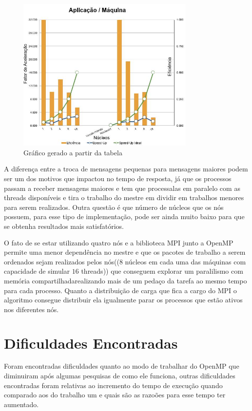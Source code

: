 \documentclass[11pt]{IEEEtran}
\begin{document}
	\begin{figure}[H]
		\centering
		\includegraphics[width=88mm]{graph.png}
		\caption{Gráfico gerado a partir da tabela}
		\label{fig_table}
	\end{figure}

	A diferença entre a troca de mensagens pequenas para mensagens maiores 
	podem ser um dos motivos que impactou no tempo de resposta, já que os processos
	passam a receber mensagens maiores e tem que processalas em paralelo com as 
	threads disponíveis e tira o trabalho do mestre em dividir em trabalhos
	menores para serem realizados. Outra questão é que número de núcleos que os nós 
	possuem, para esse tipo de implementação, pode ser ainda muito baixo para que se 
	obtenha resultados mais satisfatórios. 

	O fato de se estar utilizando quatro nós e a biblioteca MPI junto a OpenMP permite 
	uma menor dependência no mestre e que os pacotes de trabalho a serem ordenados sejam
	realizados pelos nós(($8$ núcleos em cada uma das máquinas com capacidade de simular $16$ 
	threads)) que conseguem explorar um paralilismo com memória compartilhadarealizando
	mais de um pedaço da tarefa ao mesmo tempo para cada processo. Quanto a	distribuição de 
	carga que fica a cargo do MPI o algoritmo consegue distribuir ela igualmente parar 
	os processos que estão ativos nos diferentes nós.

\section{Dificuldades Encontradas}

	Foram encontradas dificuldades quanto ao modo de trabalhar do OpenMP que diminuiram após algumas
	pesquisas de como ele funciona, outras dificuldades encontradas foram relativas ao incremento do tempo
	de execução quando comparado aos do trabalho um e quais são as razoões para esse tempo ter aumentado\@.
\end{document}
